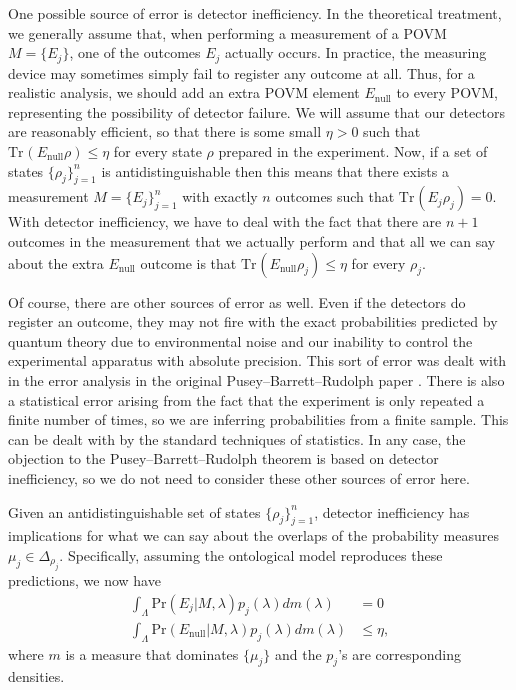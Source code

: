 \documentclass[DIV=calc,fontsize=12pt]{scrartcl} %
\theoremstyle{definition}
\theoremstyle{plain}
\newcommand{\Tr}[2][]{\ensuremath{\text{Tr}_{#1} \left ( #2 \right )}}
\begin{document}
One possible source of error is detector inefficiency.  In the
theoretical treatment, we generally assume that, when performing a
measurement of a POVM $M = \{E_j\}$, one of the outcomes $E_j$
actually occurs.  In practice, the measuring device may sometimes
simply fail to register any outcome at all.  Thus, for a realistic
analysis, we should add an extra POVM element $E_{\text{null}}$ to
every POVM, representing the possibility of detector failure.  We will
assume that our detectors are reasonably efficient, so that there is
some small $\eta > 0$ such that $\Tr{E_{\text{null}} \rho} \leq \eta$
for every state $\rho$ prepared in the experiment.  Now, if a set of
states $\{\rho_j \}_{j=1}^n$ is antidistinguishable then this means
that there exists a measurement $M = \{E_j\}_{j=1}^n$ with exactly $n$
outcomes such that $\Tr{E_j \rho_j} = 0$.  With detector inefficiency,
we have to deal with the fact that there are $n+1$ outcomes in the
measurement that we actually perform and that all we can say about the
extra $E_{\text{null}}$ outcome is that $\Tr{E_{\text{null}} \rho_j}
\leq \eta$ for every $\rho_j$.

Of course, there are other sources of error as well.  Even if the
detectors do register an outcome, they may not fire with the exact
probabilities predicted by quantum theory due to environmental noise
and our inability to control the experimental apparatus with absolute
precision.  This sort of error was dealt with in the error analysis in
the original Pusey--Barrett--Rudolph paper \cite{Pusey2012}.  There is also a statistical
error arising from the fact that the experiment is only repeated a
finite number of times, so we are inferring probabilities from a
finite sample.  This can be dealt with by the standard techniques of
statistics.  In any case, the objection to the Pusey--Barrett--Rudolph theorem is based on
detector inefficiency, so we do not need to consider these other
sources of error here.

Given an antidistinguishable set of states $\{\rho_j\}_{j=1}^n$,
detector inefficiency has implications for what we can say about the
overlaps of the probability measures $\mu_j \in \Delta_{\rho_j}$.
Specifically, assuming the ontological model reproduces these
predictions, we now have
\begin{align}
\int_{\Lambda} \text{Pr}(E_j|M,\lambda) p_j(\lambda) dm(\lambda) & =
0 \\
\int_{\Lambda} \text{Pr}(E_{\text{null}}|M,\lambda) p_j(\lambda)
dm(\lambda) & \leq \eta,
\end{align}
where $m$ is a measure that dominates $\{\mu_j\}$ and the $p_j$'s are
corresponding densities.
\end{document}
